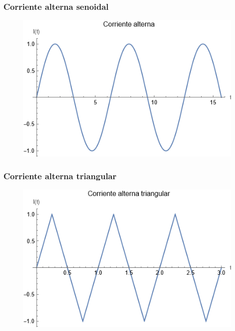 \documentclass[14pt]{beamer}
\begin{document}
\begin{frame}
\frametitle{Corriente alterna senoidal}
\begin{figure}
    \centering
    \includegraphics[scale=0.7]{Imagenes/Corriente_02.png}
\end{figure}
\end{frame}
\begin{frame}
\frametitle{Corriente alterna triangular}
\begin{figure}
    \centering
    \includegraphics[scale=0.7]{Imagenes/Corriente_04.png}
\end{figure}
\end{frame}
\end{document}
